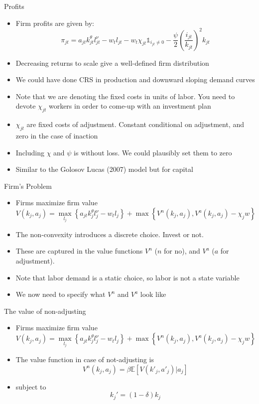 \documentclass[11pt,aspectratio=169,xcolor={dvipsnames},hyperref={pdftex,pdfpagemode=UseNone,hidelinks,pdfdisplaydoctitle=true},usepdftitle=false]{beamer}
\begin{document}
\begin{frame}{Profits}
\begin{itemize}
\item Firm profits are given by:
$$\pi_{jt} = a_{jt} k^{\theta}_{jt} l_{jt}^{\nu} - w_t l_{jt} - w_t \chi_{jt}\mathds{1}_{i_{jt} \neq 0} -  \frac{\psi}{2}\left(\frac{i_{jt}}{k_{jt}}\right)^2 k_{jt}$$
\vspace{-0.5cm}
\pause
\item Decreasing returns to scale give a well-defined firm distribution
\pause
\item We could have done CRS in production and downward sloping demand curves
\pause
\item Note that we are denoting the fixed costs in units of labor. You need to devote $\chi_{jt}$ workers in order to come-up with an investment plan
\pause
\item  $\chi_{jt}$ are fixed costs of adjustment. Constant conditional on adjustment, and zero in the case of inaction
\pause
\item Including $\chi$ and $\psi$ is without loss. We could plausibly set them to zero
\item Similar to the Golosov Lucas (2007) model but for capital
\end{itemize}
\end{frame}

\begin{frame}{Firm's Problem}
\begin{itemize}
\item Firms maximize firm value
$$V(k_j,a_j) = \max_{l_j} \left\lbrace a_{jt} k^{\theta}_{j} l_{j}^{\nu} - w_t l_{j} \right\rbrace + \max \left\lbrace V^n(k_j,a_j), V^a(k_j,a_j) - \chi_j w \right\rbrace $$
\vspace{-0.5cm}
\pause
\item The non-convexity introduces a discrete choice. Invest or not.
\pause
\item These are captured in the value functions $V^n$ ($n$ for no), and  $V^a$ ($a$ for adjustment).
\pause
\item Note that labor demand is a static choice, so labor is not a state variable
\pause
\item We now need to specify what $V^n$ and $V^a$ look like
\end{itemize}
\end{frame}


\begin{frame}{The value of non-adjusting}
\begin{itemize}
\item Firms maximize firm value
$$V(k_j,a_j) = \max_{l_j} \left\lbrace a_{jt} k^{\theta}_{j} l_{j}^{\nu} - w_t l_{j} \right\rbrace + \max \left\lbrace V^n(k_j,a_j), V^a(k_j,a_j) - \chi_j w \right\rbrace $$
\vspace{-0.5cm}
\item The value function in case of not-adjusting is
$$V^n(k_j,a_j) = \beta \mathbb{E} \left[ V(k'_j, a'_j) | a_j \right]$$
\vspace{-0.5cm}
\item subject to
$$k_j' = (1-\delta) k_j$$
\end{itemize}
\end{frame}
\end{document}
